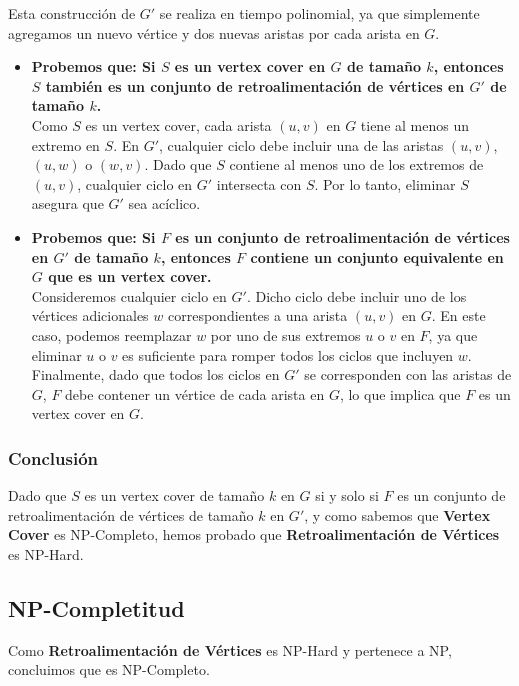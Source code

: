 \documentclass[a4paper,12pt]{article}
\begin{document}
Esta construcci\'on de $G'$ se realiza en tiempo polinomial, ya que simplemente agregamos un nuevo v\'ertice y dos nuevas aristas por cada arista en $G$.

\begin{itemize}
    \item \textbf{Probemos que: Si $S$ es un vertex cover en $G$ de tama\~no $k$, entonces $S$ tambi\'en es un conjunto de retroalimentaci\'on de v\'ertices en $G'$ de tama\~no $k$.}\\
    Como $S$ es un vertex cover, cada arista $(u, v)$ en $G$ tiene al menos un extremo en $S$. En $G'$, cualquier ciclo debe incluir una de las aristas $(u, v)$, $(u, w)$ o $(w, v)$. Dado que $S$ contiene al menos uno de los extremos de $(u, v)$, cualquier ciclo en $G'$ intersecta con $S$. Por lo tanto, eliminar $S$ asegura que $G'$ sea ac\'iclico.

    \item \textbf{Probemos que: Si $F$ es un conjunto de retroalimentaci\'on de v\'ertices en $G'$ de tama\~no $k$, entonces $F$ contiene un conjunto equivalente en $G$ que es un vertex cover.}\\
    Consideremos cualquier ciclo en $G'$. Dicho ciclo debe incluir uno de los v\'ertices adicionales $w$ correspondientes a una arista $(u, v)$ en $G$. En este caso, podemos reemplazar $w$ por uno de sus extremos $u$ o $v$ en $F$, ya que eliminar $u$ o $v$ es suficiente para romper todos los ciclos que incluyen $w$. Finalmente, dado que todos los ciclos en $G'$ se corresponden con las aristas de $G$, $F$ debe contener un v\'ertice de cada arista en $G$, lo que implica que $F$ es un vertex cover en $G$.
\end{itemize}


\subsubsection{Conclusión}
Dado que $S$ es un vertex cover de tama\~no $k$ en $G$ si y solo si $F$ es un conjunto de retroalimentaci\'on de v\'ertices de tama\~no $k$ en $G'$, y como sabemos que \textbf{Vertex Cover} es NP-Completo, hemos probado que \textbf{Retroalimentaci\'on de V\'ertices} es NP-Hard.

\subsection{NP-Completitud}

Como \textbf{Retroalimentaci\'on de V\'ertices} es NP-Hard y pertenece a NP, concluimos que es NP-Completo.
\end{document}
